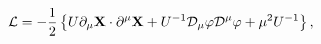 \begin{equation}\label{nlsm_lag}
 {\cal L} 
 = -{1\over 2}\left\{U\partial_\mu{\bf X}\cdot
 \partial^\mu {\bf X} + U^{-1}{\cal D}_\mu \varphi {\cal D}^\mu
 \varphi + \mu^2 U^{-1}\right\},
\end{equation}

